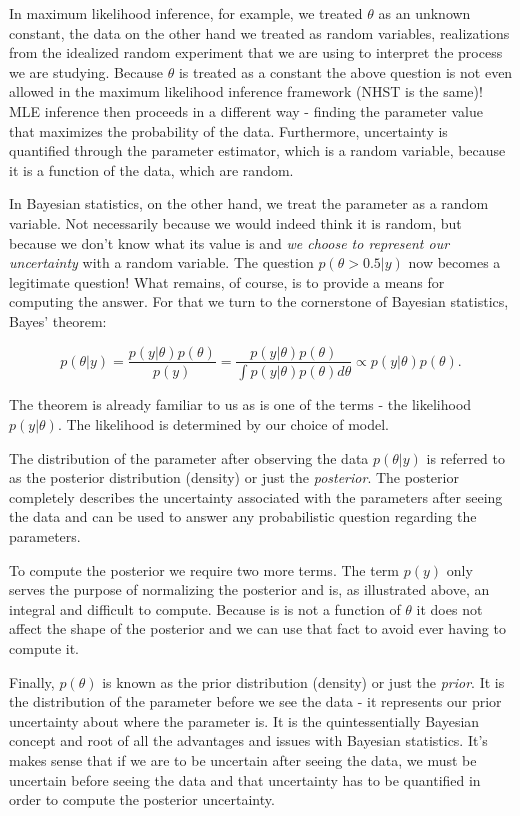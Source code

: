 \documentclass{book}
\theoremstyle{plain}%
\theoremstyle{definition}
\begin{document}
In maximum likelihood inference, for example, we treated $\theta$ as an unknown constant, the data on the other hand we treated as random variables, realizations from the idealized random experiment that we are using to interpret the process we are studying.    Because $\theta$ is treated as a constant the above question is not even allowed in the maximum likelihood inference framework (NHST is the same)! MLE inference then proceeds in a different way - finding the parameter value that maximizes the probability of the data. Furthermore, uncertainty is quantified through the parameter estimator, which is a random variable, because it is a function of the data, which are random.

In Bayesian statistics, on the other hand, we treat the parameter as a random variable. Not necessarily because we would indeed think it is random, but because we don't know what its value is and \emph{we choose to represent our uncertainty} with a random variable. The question $p(\theta > 0.5|y)$ now becomes a legitimate question! What remains, of course, is to provide a means for computing the answer. For that we turn to the cornerstone of Bayesian statistics, Bayes' theorem:

$$p(\theta|y) = \frac{p(y|\theta)p(\theta)}{p(y)} = \frac{p(y|\theta)p(\theta)}{\int p(y|\theta)p(\theta)d\theta} \propto p(y|\theta)p(\theta).$$

The theorem is already familiar to us as is one of the terms - the likelihood $p(y|\theta)$. The likelihood is determined by our choice of model.

The distribution of the parameter after observing the data $p(\theta|y)$ is referred to as the posterior distribution (density) or just the \emph{posterior}. The posterior completely describes the uncertainty associated with the parameters after seeing the data and can be used to answer any probabilistic question regarding the parameters.

To compute the posterior we require two more terms. The term $p(y)$ only serves the purpose of normalizing the posterior and is, as illustrated above, an integral and difficult to compute. Because is is not a function of $\theta$ it does not affect the shape of the posterior and we can use that fact to avoid ever having to compute it.

Finally, $p(\theta)$ is known as the prior distribution (density) or just the \emph{prior}. It is the distribution of the parameter before we see the data - it represents our prior uncertainty about where the parameter is. It is the quintessentially Bayesian concept and root of all the advantages and issues with Bayesian statistics. It's makes sense that if we are to be uncertain after seeing the data, we must be uncertain before seeing the data and that uncertainty has to be quantified in order to compute the posterior uncertainty.
\end{document}
